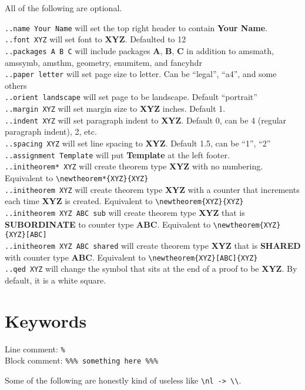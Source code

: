 \documentclass[12pt]{article}
\newcommand{\nl}{\\}
\renewcommand\bold{\textbf}
\begin{document}
\begin{flushleft}
\bigskip
\bigskip

All of the following are optional.

\verb|..name Your Name| will set the top right header to contain \bold{Your Name}. \nl
\verb|..font XYZ| will set font to \bold{XYZ}. Defaulted to 12 \nl
\verb|..packages A B C| will include packages \bold{A}, \bold{B}, \bold{C} in addition to amsmath, amssymb, amsthm, geometry, enumitem, and fancyhdr \nl
\verb|..paper letter| will set page size to letter. Can be ``legal'', ``a4'', and some others\nl
\verb|..orient landscape| will set page to be landscape. Default ``portrait''\nl
\bigskip
\verb|..margin XYZ| will set margin size to \bold{XYZ} inches. Default 1.\nl
\verb|..indent XYZ| will set paragraph indent to \bold{XYZ}. Default 0, can be 4 (regular paragraph indent), 2, etc. \nl
\verb|..spacing XYZ| will set line spacing to \bold{XYZ}. Default 1.5, can be ``1'', ``2''\nl
\verb|..assignment Template| will put \bold{Template} at the left footer. \nl
\bigskip
\verb|..initheorem* XYZ| will create theorem type \bold{XYZ} with no numbering. Equivalent to \verb|\newtheorem*{XYZ}{XYZ}|\nl
\verb|..initheorem XYZ| will create theorem type \bold{XYZ} with a counter that increments each time \bold{XYZ} is created. Equivalent to \verb|\newtheorem{XYZ}{XYZ}|\nl
\verb|..initheorem XYZ ABC sub| will create theorem type \bold{XYZ} that is \bold{SUBORDINATE} to counter type \bold{ABC}. Equivalent to \verb|\newtheorem{XYZ}{XYZ}[ABC]|\nl
\verb|..initheorem XYZ ABC shared| will create theorem type \bold{XYZ} that is \bold{SHARED} with counter type \bold{ABC}. Equivalent to \verb|\newtheorem{XYZ}[ABC]{XYZ}|\nl
\verb|..qed XYZ| will change the symbol that sits at the end of a proof to be \bold{XYZ}. By default, it is a white square.

\newpage

\section*{Keywords}

Line comment: \verb|%|\nl
Block comment: \verb|%|\verb|%|\verb|%|\verb| something here |\verb|%|\verb|%|\verb|%|

\medskip

Some of the following are honestly kind of useless like \verb|\nl -> \\|.


\end{flushleft}
\end{document}
